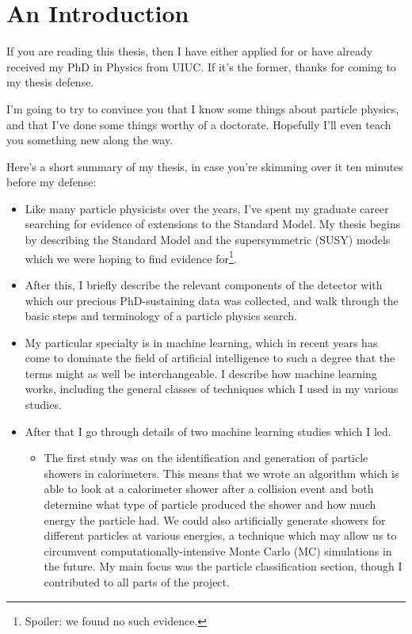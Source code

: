 \chapter*{An Introduction}

If you are reading this thesis, then I have either applied for or have  already received my PhD in Physics from UIUC. If it's the former, thanks for coming to my thesis defense.

I'm going to try to convince you that I know some things about particle physics, and that I've done some things worthy of a doctorate. Hopefully I'll even teach you something new along the way.

Here's a short summary of my thesis, in case you're skimming over it ten minutes before my defense:

\begin{itemize}

    \item Like many particle physicists over the years, I've spent my graduate career searching for evidence of extensions to the Standard Model. My thesis begins by describing the Standard Model and the supersymmetric (SUSY) models which we were hoping to find evidence for\footnote{Spoiler: we found no such evidence.}.
    
    \item After this, I briefly describe the relevant components of the detector with which our precious PhD-sustaining data was collected, and walk through the basic steps and terminology of a particle physics search.

    \item My particular specialty is in machine learning, which in recent years has come to dominate the field of artificial intelligence to such a degree that the terms might as well be interchangeable. I describe how machine learning works, including the general classes of techniques which I used in my various studies.
    
    \item After that I go through details of two machine learning studies which I led.
    
    \begin{itemize}
    
        \item The first study was on the identification and generation of particle showers in calorimeters. This means that we wrote an algorithm which is able to look at a calorimeter shower after a collision event and both determine what type of particle produced the shower and how much energy the particle had. We could also artificially generate showers for different particles at various energies, a technique which may allow us to circumvent computationally-intensive Monte Carlo (MC) simulations in the future. My main focus was the particle classification section, though I contributed to all parts of the project.


\end{itemize}
\end{itemize}
